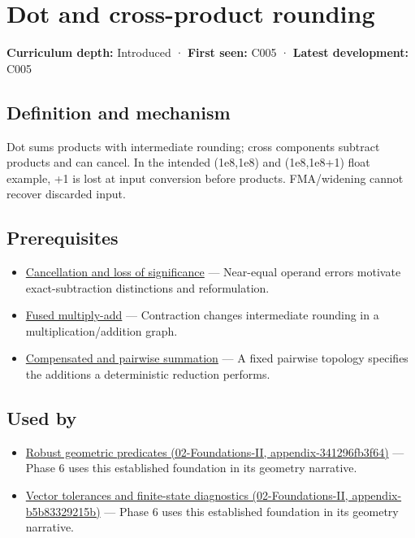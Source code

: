 \hypertarget{appendix-5aef4f13483a}{}
\section{Dot and cross-product rounding}\label{appendix-5aef4f13483a-dot-and-cross-product-rounding}

\textbf{Curriculum depth:} Introduced · \textbf{First seen:} C005 · \textbf{Latest development:} C005

\subsection{Definition and mechanism}\label{appendix-5aef4f13483a-definition-and-mechanism}

Dot sums products with intermediate rounding; cross components subtract products and can cancel. In the intended (1e8,1e8) and (1e8,1e8+1) float example, +1 is lost at input conversion before products. FMA/widening cannot recover discarded input.

\subsection{Prerequisites}\label{appendix-5aef4f13483a-prerequisites}

\begin{itemize}
\tightlist
\item
  \hyperref[appendix-a2773a6a2f9d]{Cancellation and loss of significance} --- Near-equal operand errors motivate exact-subtraction distinctions and reformulation.
\item
  \hyperref[appendix-41e8ef22a21e]{Fused multiply-add} --- Contraction changes intermediate rounding in a multiplication/addition graph.
\item
  \hyperref[appendix-df318da57389]{Compensated and pairwise summation} --- A fixed pairwise topology specifies the additions a deterministic reduction performs.
\end{itemize}

\subsection{Used by}\label{appendix-5aef4f13483a-used-by}

\begin{itemize}
\tightlist
\item
  \href{../02-Foundations-II/main.pdf\#nameddest=appendix-341296fb3f64}{Robust geometric predicates (02-Foundations-II, appendix-341296fb3f64)} --- Phase 6 uses this established foundation in its geometry narrative.
\item
  \href{../02-Foundations-II/main.pdf\#nameddest=appendix-b5b83329215b}{Vector tolerances and finite-state diagnostics (02-Foundations-II, appendix-b5b83329215b)} --- Phase 6 uses this established foundation in its geometry narrative.
\end{itemize}

